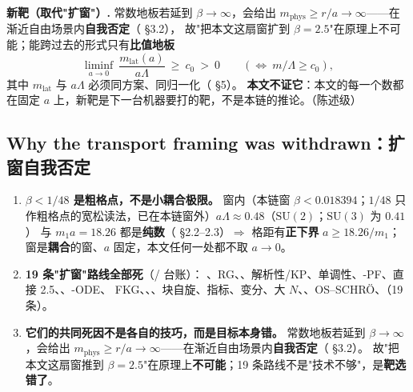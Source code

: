 \textbf{新靶（取代"扩窗"）.} 常数地板若延到 $\beta\to\infty$，会给出
$m_{\mathrm{phys}}\ge r/a\to\infty$——在渐近自由场景内\textbf{自我否定}（ \S3.2），
故"把本文这扇窗扩到 $\beta=2.5$"在原理上不可能；能跨过去的形式只有\textbf{比值地板}
\begin{equation}
\liminf_{a\to0}\ \frac{m_{\mathrm{lat}}(a)}{a\Lambda}\ \ge\ c_0\ >\ 0
\qquad(\Longleftrightarrow\ m/\Lambda\ge c_0),
\end{equation}
其中 $m_{\mathrm{lat}}$ 与 $a\Lambda$ 必须同方案、同归一化（ \S5）。
\textbf{本文不证它}：本文的每一个数都在固定 $a$ 上，新靶是下一台机器要打的靶，不是本链的推论。\LM（陈述级）

\subsection{Why the transport framing was withdrawn：扩窗自我否定}\label{sec:transport-withdrawn}

\begin{notbox}
\begin{enumerate}[label=(\roman*)]
\item \textbf{$\beta<1/48$ 是粗格点，不是小耦合极限。} 窗内（本链窗 $\beta<0.018394$；$1/48$ 只作粗格点的宽松读法，已在本链窗外）$a\Lambda\approx0.48$（$\mathrm{SU}(2)$；$\mathrm{SU}(3)$ 为 $0.41$）
与 $m_1a=18.26$ 都是\textbf{纯数}（ \S2.2--2.3）$\Rightarrow$ 格距有\textbf{正下界} $a\ge18.26/m_1$；
窗是\textbf{耦合}的窗、$a$ 固定，本文任何一处都不取 $a\to0$。
\item \textbf{19 条"扩窗"路线全部死}（/ 台账）：
、RG、、解析性/KP、单调性、\code{$\Omega$}-PF、直接 2.5、、\code{$\beta$}-ODE、
FKG、、、块自旋、指标、变分、大 $N$、、OS--SCHR\"O、（19 条）。
\item \textbf{它们的共同死因不是各自的技巧，而是目标本身错。} 常数地板若延到 $\beta\to\infty$，会给出
$m_{\mathrm{phys}}\ge r/a\to\infty$——在渐近自由场景内\textbf{自我否定}（ \S3.2）。
故"把本文这扇窗推到 $\beta=2.5$"在原理上\textbf{不可能}；19 条路线不是"技术不够"，是\textbf{靶选错了}。
\end{enumerate}
\end{notbox}


